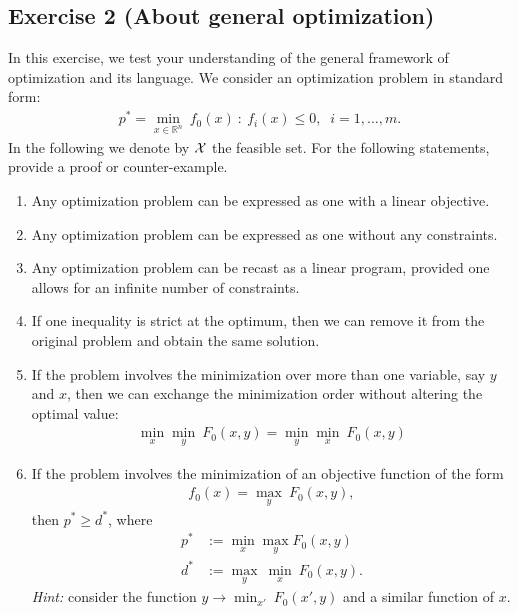 \documentclass[11pt]{article}
\begin{document}
\newpage
\subsection*{Exercise 2 (About general optimization)}

In this exercise, we test your understanding of the general framework of optimization and its language. We consider an optimization problem in standard form:
\begin{align*}
    p^* = \min_{x \in \mathbb{R}^n} \: f_0(x) ~:~ f_i(x) \le 0, \;\; i=1,\ldots,m.
\end{align*}
In the following we denote by ${\cal X}$ the feasible set. For the following statements, provide a proof or counter-example.

\begin{enumerate}
	\item Any optimization problem can be expressed as one with a linear objective.
	
	\item Any optimization problem can be expressed as one without any constraints.
	
	\item Any optimization problem can be recast as a linear program, provided one allows for an infinite number of constraints.
	
	\item If one inequality is strict at the optimum, then we can remove it from the original problem and obtain the same solution.
	
	\item If the problem involves the minimization over more than one variable, say $y$ and $x$, then we can exchange the minimization order without altering the optimal value:
    \begin{align*}
    	\min_x\min_y \: F_0(x,y) = \min_y\min_x \: F_0(x,y)
	\end{align*}
	
	\item If the problem involves the minimization of an objective function of the form
    \begin{align*}
    	f_0(x) = \max_y \: F_0(x,y),
	\end{align*}
    then $p^* \ge d^*$, where
    \begin{align*}
        p^* &:= \min_{x} \max_y F_0(x, y) \\
    	d^* &:= \max_y \: \min_{x} \: F_0(x,y).
	\end{align*}
	{\em Hint:} consider the function $y \rightarrow \min_{x'} \: F_0(x',y)$ and a similar function of $x$.
\end{enumerate}
\end{document}
